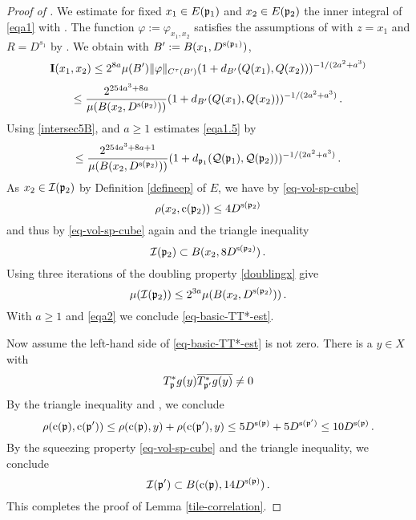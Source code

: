 \begin{proof}[Proof of ]
We estimate for fixed $x_1\in E({\mathfrak p}_1)$ and
$x_2\in E({\mathfrak p}_2)$ the inner integral of \eqref{eqa1} with
. The function
$\varphi:=\varphi_{x_1,x_2}$ satisfies the assumptions of
 with $z = x_1$ and $R = D^{s_1}$ by .
We obtain with $B':= B(x_1, D^{{\mathrm{s}}({\mathfrak p}_1)})$,
\begin{equation*}
 {\bf I}(x_1, x_2) \le 2^{8a} \mu(B') \|{\varphi}\|_{C^\tau(B')}
       (1 + d_{B'}({Q}(x_1),{Q}(x_2)))^{-1/(2a^2+a^3)}
\end{equation*}
\begin{equation}
\label{eqa1.5}
 \le \frac{2^{254a^3+8a}}
 {\mu(B(x_2, D^{{\mathrm{s}}({\mathfrak p}_2)}))}
       (1 + d_{B'}({Q}(x_1),{Q}(x_2)))^{-1/(2a^2+a^3)}\,.
\end{equation}
Using \eqref{intersec5B},  and $a\ge 1$ estimates \eqref{eqa1.5} by
\begin{equation}\label{eqa2}
 \le \frac{2^{254a^3 + 8a + 1}}
 {\mu(B(x_2, D^{{\mathrm{s}}({\mathfrak p}_2)}))}
       (1+d_{{\mathfrak p}_1}({\mathcal{Q}}({\mathfrak p}_1), {\mathcal{Q}}({\mathfrak p}_2)))^{-1/(2a^2+a^3)}\,.
\end{equation}
As $x_2\in {\mathcal{I}}({\mathfrak p}_2)$ by Definition \eqref{defineep} of $E$, we have by \eqref{eq-vol-sp-cube}
\begin{equation}
    \rho(x_2,{\mathrm{c}}({\mathfrak p}_2))\le 4D^{{\mathrm{s}}({\mathfrak p}_2)}
\end{equation}
and thus by \eqref{eq-vol-sp-cube} again and the triangle inequality
\begin{equation}
    {\mathcal{I}}({\mathfrak p}_2)\subset B(x_2,8D^{{\mathrm{s}}({\mathfrak p}_2)})\, .
\end{equation}
Using three iterations of the doubling property \eqref{doublingx} give
\begin{equation}
    \mu({\mathcal{I}}({\mathfrak p}_2))\le 2^{3a}\mu(B(x_2,D^{{\mathrm{s}}({\mathfrak p}_2)}))\, .
\end{equation}
With $a\ge 1$ and \eqref{eqa2} we conclude \eqref{eq-basic-TT*-est}.


Now assume the left-hand side of \eqref{eq-basic-TT*-est} is not zero.
There is a $y\in X$ with
\begin{equation}
    T^*_{{\mathfrak p}}g(y)\overline{T^*_{{\mathfrak p}'}g(y)}\neq 0
\end{equation}
By the triangle inequality and , we conclude
\begin{equation}
   \rho({\mathrm{c}}({\mathfrak p}),{\mathrm{c}}({\mathfrak p}'))\le \rho({\mathrm{c}}({\mathfrak p}),y) +\rho({\mathrm{c}}({\mathfrak p}'),y)
   \le 5D^{{\mathrm{s}}({\mathfrak p})}+5D^{{\mathrm{s}}({\mathfrak p}')}\le 10 D^{{\mathrm{s}}({\mathfrak p})}\, .
\end{equation}
By the squeezing property \eqref{eq-vol-sp-cube} and the triangle inequality,
we conclude
\begin{equation}
    {\mathcal{I}}({\mathfrak p}') \subset B({\mathrm{c}}({\mathfrak p}), 14D^{{\mathrm{s}}({\mathfrak p})})\, .
\end{equation}
   This completes the proof of Lemma \ref{tile-correlation}.
\end{proof}




